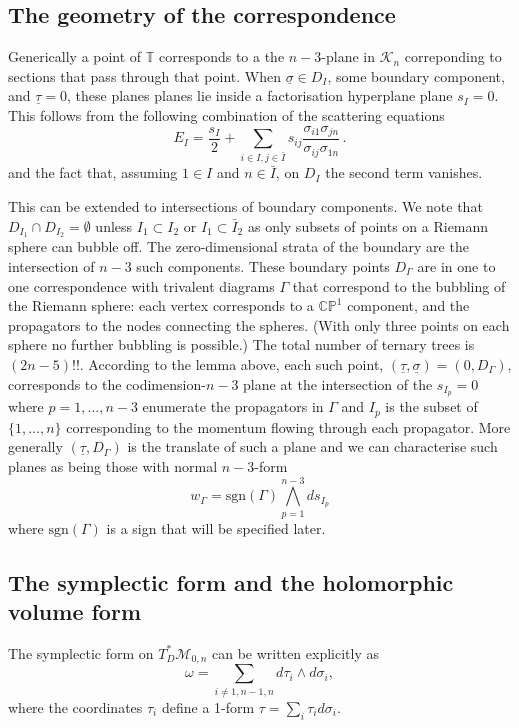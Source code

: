 \documentclass[11pt]{article}
\newcommand{\CP}{\mathbb{CP}}
\newcommand{\T}{\mathbb{T}}
\newcommand{\cK}{\mathcal{K}}
\newcommand{\cM}{\mathcal{M}}
\newcommand{\sgn}{\mathrm{sgn}}
\newcommand{\bs}{\underline{\sigma}}
\newcommand{\bt}{\underline{\tau}}
\newcommand{\1}{{\rm 1\hskip-0.25em I}}
\begin{document}
\subsection{The geometry of the correspondence}
Generically a point of $\T$ corresponds to a the $n-3$-plane in $\cK_n$ correponding to sections that pass through that point. 
When $\bs \in D_I$, some boundary component,  and $\bt=0$,   these planes planes lie inside a factorisation hyperplane plane $s_I=0$. 
This follows from the following  combination \cite{Dolan:2013isa} of the scattering equations
\begin{equation}
E_I=\frac{s_I}{2} + \sum_{i\in I, j\in \bar I} s_{ij} \frac{\sigma_{i1}\sigma_{jn}}{\sigma_{ij}\sigma_{1n}}\, .
\end{equation}
and the fact that, assuming $1\in I$ and $n\in \bar I$, on $D_I$ the second term vanishes.


This can be extended to intersections of boundary components.  We note that $D_{I_1}\cap D_{I_2}=\emptyset$ unless $I_1\subset I_2$ or $I_1\subset \bar I_2$ as only subsets of points on a Riemann sphere can bubble off.  The zero-dimensional strata of the boundary are the intersection of $n-3$ such components.  These boundary points $D_\Gamma$ are in one to one correspondence with trivalent diagrams $\Gamma$ that  correspond to the bubbling of the Riemann sphere:  each vertex corresponds to a $\CP^1$ component, and the propagators to the nodes connecting the spheres.  (With only three points on each sphere no further bubbling is possible.) The total number of ternary trees is $(2n-5)!!$. According to the lemma above, each such point, $(\bt,\bs)=(0,D_\Gamma)$, corresponds to the codimension-$n-3$ plane at the intersection of the $s_{I_p}=0$ where $p=1,\ldots , n-3$ enumerate the propagators in $\Gamma$ and $I_p$ is the subset of $\{1, \ldots ,n\}$ corresponding to the momentum flowing through each propagator.  More generally $(\bt, D_\Gamma)$ is the translate of such a plane and we can characterise such planes as being those with normal $n-3$-form
 \begin{equation}
 w_\Gamma= \sgn(\Gamma)\bigwedge_{p=1}^{n-3} d s_{I_p}
 \end{equation}
 where $\sgn(\Gamma)$ is a sign that will be specified later.






\subsection{The symplectic form and the holomorphic volume form}
The symplectic form on $T^*_D\cM_{0,n}$ can be written explicitly as
$$
\omega = \sum_{i\neq 1,n-1,n} d\tau_i \wedge d\sigma_i,
$$
where the coordinates $\tau_i$ define a 1-form $\tau = \sum_i \tau_id\sigma_i$. 
\end{document}

